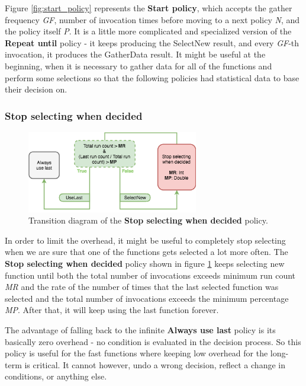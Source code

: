 Figure \ref{fig:start_policy} represents the \textbf{Start policy}, which accepts the gather frequency \textit{GF}, number of invocation times before moving to a next policy \textit{N}, and the policy itself \textit{P}. It is a little more complicated and specialized version of the \textbf{Repeat until} policy - it keeps producing the SelectNew result, and every \textit{GF}-th invocation, it produces the GatherData result. It might be useful at the beginning, when it is necessary to gather data for all of the functions and perform some selections so that the following policies had statistical data to base their decision on.

\subsubsection{Stop selecting when decided}

\begin{figure}[h!]
	\captionsetup{justification=centering,margin=0.5cm}
	\centerline{\mbox{\includegraphics[width=75mm]{./img/stop_selecting_when_decided.png}}}
	\caption{Transition diagram of the \textbf{Stop selecting  when decided} policy.}
	\label{fig:stop_selecting_when_decided}
\end{figure}

In order to limit the overhead, it might be useful to completely stop selecting when we are sure that one of the functions gets selected a lot more often. The \textbf{Stop selecting when decided} policy shown in figure \ref{fig:stop_selecting_when_decided} keeps selecting new function until both the total number of invocations exceeds minimum run count \textit{MR} and the rate of the number of times that the last selected function was selected and the total number of invocations exceeds the minimum percentage \textit{MP}. After that, it will keep using the last function forever. 

The advantage of falling back to the infinite \textbf{Always use last} policy is its basically zero overhead - no condition is evaluated in the decision process. So this policy is useful for the fast functions where keeping low overhead for the long-term is critical. It cannot however, undo a wrong decision, reflect a change in conditions, or anything else.

